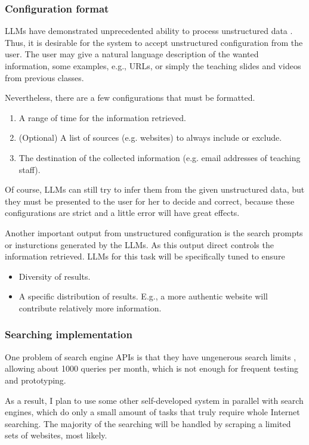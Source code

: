 \documentclass[project-plan]{report-template}
\begin{document}
\subsubsection{Configuration format} 
LLMs have demonstrated unprecedented ability to process unstructured data
\cite{llm.unstructured.data.1, llm.unstructured.data.2}. Thus, it is desirable
for the system to accept unstructured configuration from the user. The user may
give a natural language description of the wanted information, some
examples, e.g., URLs, or simply the teaching slides and videos
from previous classes.

Nevertheless, there are a few configurations that must be formatted.
\begin{enumerate}
	\item A range of time for the information retrieved.
	\item (Optional) A list of sources (e.g. websites) to always include or exclude.
	\item The destination of the collected information (e.g. email addresses of
		teaching staff).
\end{enumerate}
Of course, LLMs can still try to infer them from the given unstructured data,
but they must be presented to the user for her to decide and correct, because
these configurations are strict and a little error will have great effects.

Another important output from unstructured configuration is the search prompts
or insturctions generated by the LLMs. As this output direct controls the
information retrieved. LLMs for this task will be specifically tuned to ensure
\begin{itemize}
	\item Diversity of results.
	\item A specific distribution of results. E.g., a more authentic website
		will contribute relatively more information.
\end{itemize}

\subsubsection{Searching implementation} 
One problem of search engine APIs is that they have ungenerous search limits
\cite{search.api.limit.1}, allowing about 1000 queries per month, which is not
enough for frequent testing and prototyping.

As a result, I plan to use some other self-developed system in parallel with
search engines, which do only a small amount of tasks that truly require whole
Internet searching. The majority of the searching will be handled by scraping a
limited sets of websites, most likely.
\end{document}

